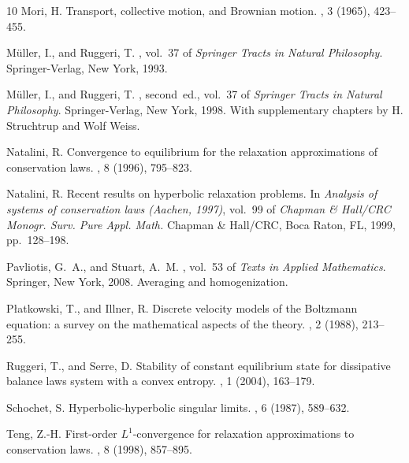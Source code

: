 \documentclass{article}
\theoremstyle{plain}%
\theoremstyle{definition}%
\theoremstyle{remark}%
\newcommand{\+}[1]{{\bm{#1}}}
\begin{document}
\begin{thebibliography}{10}
  {\sc Mori, H.}
  \newblock Transport, collective motion, and {B}rownian motion.
  , 3 (1965), 423--455.
  
  {\sc M\"{u}ller, I., and Ruggeri, T.}
  , vol.~37 of {\em Springer Tracts in
    Natural Philosophy}.
  \newblock Springer-Verlag, New York, 1993.
  
  {\sc M\"{u}ller, I., and Ruggeri, T.}
  , second~ed., vol.~37 of {\em
    Springer Tracts in Natural Philosophy}.
  \newblock Springer-Verlag, New York, 1998.
  \newblock With supplementary chapters by H. Struchtrup and Wolf Weiss.
  
  {\sc Natalini, R.}
  \newblock Convergence to equilibrium for the relaxation approximations of
    conservation laws.
  , 8 (1996), 795--823.
  
  {\sc Natalini, R.}
  \newblock Recent results on hyperbolic relaxation problems.
  \newblock In {\em Analysis of systems of conservation laws ({A}achen, 1997)},
    vol.~99 of {\em Chapman \& Hall/CRC Monogr. Surv. Pure Appl. Math.} Chapman
    \& Hall/CRC, Boca Raton, FL, 1999, pp.~128--198.
  
  {\sc Pavliotis, G.~A., and Stuart, A.~M.}
  , vol.~53 of {\em Texts in Applied
    Mathematics}.
  \newblock Springer, New York, 2008.
  \newblock Averaging and homogenization.
  
  {\sc P{\l}atkowski, T., and Illner, R.}
  \newblock Discrete velocity models of the {B}oltzmann equation: a survey on the
    mathematical aspects of the theory.
  , 2 (1988), 213--255.
  
  {\sc Ruggeri, T., and Serre, D.}
  \newblock Stability of constant equilibrium state for dissipative balance laws
    system with a convex entropy.
  , 1 (2004), 163--179.
  
  {\sc Schochet, S.}
  \newblock Hyperbolic-hyperbolic singular limits.
  , 6 (1987), 589--632.
  
  {\sc Teng, Z.-H.}
  \newblock First-order {$L^1$}-convergence for relaxation approximations to
    conservation laws.
  , 8 (1998), 857--895.
  

\end{thebibliography}
\end{document}
